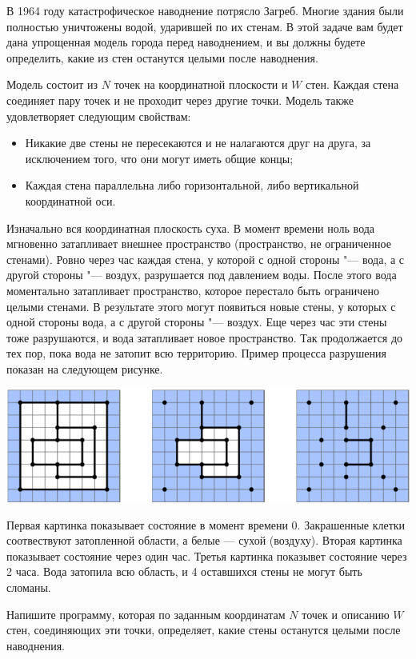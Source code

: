 В 1964 году катастрофическое наводнение потрясло Загреб. Многие здания были полностью 
уничтожены водой, ударившей по их стенам. В этой задаче вам будет дана упрощенная модель города 
перед наводнением, и вы должны будете определить, какие из стен останутся целыми после наводнения. 

Модель состоит из $N$ точек на координатной плоскости и $W$ стен. Каждая стена соединяет пару точек 
и не проходит через другие точки. Модель также удовлетворяет следующим свойствам: 
\begin{itemize}
\item Никакие две стены не пересекаются и не налагаются друг на друга, за исключением того, что они 
могут иметь общие концы; 
\item Каждая стена параллельна либо горизонтальной, либо вертикальной координатной оси. 
\end{itemize}

Изначально вся координатная плоскость суха. В момент времени ноль вода мгновенно затапливает 
внешнее пространство (пространство, не ограниченное стенами). Ровно через час каждая стена, у 
которой с одной стороны "--- вода, а с другой стороны "--- воздух, разрушается под давлением воды. После 
этого вода моментально затапливает пространство, которое перестало быть ограничено целыми стенами. 
В результате этого могут появиться новые стены, у которых с одной стороны вода, а с другой стороны "--- воздух. Еще через час эти стены тоже разрушаются, и вода затапливает новое пространство. Так 
продолжается до тех пор, пока вода не затопит всю территорию. 
Пример процесса разрушения показан на следующем рисунке. 

\includegraphics[scale=0.5]{flood.png}

Первая картинка показывает состояние в момент времени 0. Закрашенные клетки соотвествуют затопленной области, а белые --- сухой (воздуху). Вторая картинка показывает состояние через один час. Третья картинка показывет состояние через 2 часа. Вода затопила всю область, и 4 оставшихся стены не могут быть сломаны.


Напишите программу, которая по заданным координатам $N$ точек и описанию $W$ стен, соединяющих 
эти точки, определяет, какие стены останутся целыми после наводнения.
